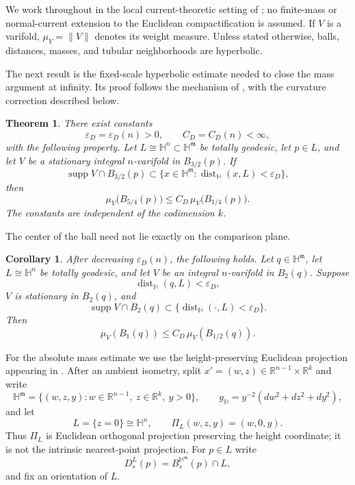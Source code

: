 \documentclass[11pt,reqno]{amsart}
\numberwithin{equation}{section}
\newtheorem{theorem}{Theorem}[section]
\newtheorem{corollary}[corollary]{Corollary}
\theoremstyle{definition}
\theoremstyle{remark}
\newcommand{\Hyp}{\mathbb H}
\newcommand{\R}{\mathbb R}
\newcommand{\supp}{\operatorname{supp}}
\newcommand{\dist}{\operatorname{dist}}
\newcommand{\eps}{\varepsilon}
\begin{document}
We work throughout in the local current-theoretic setting of
\cite[Assumption~1.3]{JiangXie}; no finite-mass or normal-current extension
to the Euclidean compactification is assumed.  If $V$ is a varifold,
$\mu_V=\|V\|$ denotes its weight measure.  Unless stated otherwise, balls,
distances, masses, and tubular neighborhoods are hyperbolic.

The next result is the fixed-scale hyperbolic estimate needed to close the
mass argument at infinity.  Its proof follows the mechanism of
\cite[Theorem~0.5]{ColdingMinicozzi}, with the curvature correction described
below.

\begin{theorem}
\label{thm:hyperbolic-comparison}
There exist constants
\[
 \eps_D=\eps_D(n)>0,
 \qquad
 C_D=C_D(n)<\infty,
\]
with the following property.  Let
$L\cong\Hyp^n\subset\Hyp^{\mathfrak m}$ be
totally geodesic, let $p\in L$, and let $V$ be a stationary integral
$n$-varifold in $B_{3/2}(p)$.  If
\begin{equation}\label{eq:confinement-main}
 \supp V\cap B_{3/2}(p)
 \subset\bigl\{x\in\Hyp^{\mathfrak m}:\dist_{\Hyp}(x,L)<\eps_D\bigr\},
\end{equation}
then
\begin{equation}\label{eq:mass-comparison-main}
 \mu_V\bigl(B_{5/4}(p)\bigr)
 \le C_D\,\mu_V\bigl(B_{1/4}(p)\bigr).
\end{equation}
The constants are independent of the codimension $k$.
\end{theorem}

The center of the ball need not lie exactly on the comparison plane.

\begin{corollary}\label{cor:shifted-comparison}
After decreasing $\eps_D(n)$, the following holds.  Let
$q\in\Hyp^{\mathfrak m}$, let $L\cong\Hyp^n$ be totally geodesic, and let
$V$ be an integral $n$-varifold in $B_2(q)$.  Suppose
\[
 \dist_{\Hyp}(q,L)<\eps_D,
\]
$V$ is stationary in $B_2(q)$, and
\[
 \supp V\cap B_2(q)
 \subset\{\dist_{\Hyp}(\cdot,L)<\eps_D\}.
\]
Then
\begin{equation}\label{eq:shifted-comparison}
 \mu_V(B_1(q))\le C_D\,\mu_V(B_{1/2}(q)).
\end{equation}
\end{corollary}

For the absolute mass estimate we use the height-preserving Euclidean
projection appearing in \cite{JiangXie}.  After an ambient isometry, split
$x'=(w,z)\in\R^{n-1}\times\R^k$ and write
\begin{equation}\label{eq:upper-half-space-splitting}
 \Hyp^{\mathfrak m}
 =\{(w,z,y):w\in\R^{n-1},\ z\in\R^k,\ y>0\},
 \qquad
 g_{\Hyp}=y^{-2}(dw^2+dz^2+dy^2),
\end{equation}
and let
\begin{equation}\label{eq:vertical-plane-projection}
 L=\{z=0\}\cong\Hyp^n,
 \qquad
 \Pi_L(w,z,y)=(w,0,y).
\end{equation}
Thus $\Pi_L$ is Euclidean orthogonal projection preserving the height
coordinate; it is not the intrinsic nearest-point projection.  For $p\in L$
write
\[
 D_s^L(p)=B_s^{\Hyp^{\mathfrak m}}(p)\cap L,
\]
and fix an orientation of $L$.
\end{document}
